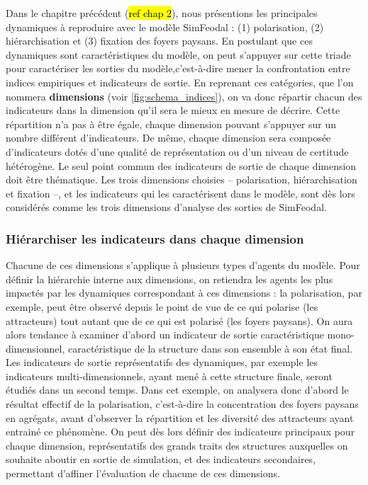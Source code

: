 Dans le chapitre précédent (\hl{ref chap 2}), nous présentions les principales dynamiques à reproduire avec le modèle SimFeodal :
(1) polarisation, (2) hiérarchisation et (3) fixation des foyers paysans.
En postulant que ces dynamiques sont caractéristiques du modèle, on peut s'appuyer sur cette triade pour caractériser les sorties du modèle,c'est-à-dire mener la confrontation entre indices empiriques et indicateurs de sortie.
En reprenant ces catégories, que l'on nommera \textbf{dimensions} (voir \cref{fig:schema_indices}), on va donc répartir chacun des indicateurs dans la dimension qu'il sera le mieux en mesure de décrire.
Cette répartition n'a pas à être égale, chaque dimension pouvant s'appuyer sur un nombre différent d'indicateurs.
De même, chaque dimension sera composée d'indicateurs dotés d'une qualité de représentation ou d'un niveau de certitude hétérogène.
Le seul point commun des indicateurs de sortie de chaque dimension doit être thématique.
Les trois dimensions choisies -- polarisation, hiérarchisation et fixation --, et les indicateurs qui les caractérisent dans le modèle, sont dès lors considérés comme les trois dimensions d'analyse des sorties de SimFeodal.

\subsubsection{Hiérarchiser les indicateurs dans chaque dimension}\label{par:hierarchie_interne}
Chacune de ces dimensions s'applique à plusieurs types d'agents du modèle.
Pour définir la hiérarchie interne aux dimensions, on retiendra les agents les plus impactés par les dynamiques correspondant à ces dimensions :
la polarisation, par exemple, peut être observé depuis le point de vue de ce qui polarise (les attracteurs) tout autant que de ce qui est polarisé (les foyers paysans).
On aura alors tendance à examiner d'abord un indicateur de sortie caractéristique mono-dimensionnel, caractéristique de la structure dans son ensemble à son état final.
Les indicateurs de sortie représentatifs des dynamiques, par exemple les indicateurs multi-dimensionnels, ayant mené à cette structure finale, seront étudiés dans un second temps.
Dans cet exemple, on analysera donc d'abord le résultat effectif de la polarisation, c'est-à-dire la concentration des foyers paysans en agrégats, avant d'observer la répartition et les diversité des attracteurs ayant entrainé ce phénomène.
On peut dès lors définir des \og indicateurs principaux\fg{} pour chaque dimension, représentatifs des grands traits des structures auxquelles on souhaite aboutir en sortie de simulation, et des \og indicateurs secondaires\fg{}, permettant d'affiner l'évaluation de chacune de ces dimensions.

